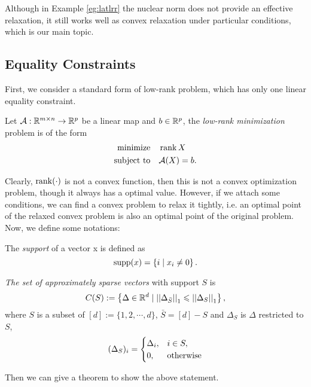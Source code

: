 \documentclass[11pt]{article}
\begin{document}
Although in Example \ref{eg:latlrr} the nuclear norm does not provide an effective relaxation, it still works well as convex relaxation under particular conditions, which is our main topic.

\subsection{Equality Constraints}

First, we consider a standard form of low-rank problem, which has only one linear equality constraint.
\begin{problem}
    Let \(\mathcal{A}:\mathbb R^{m\times n}\to \mathbb R^p\) be a linear map and \(b\in \mathbb R^p\), the \emph{low-rank minimization} problem is of the form 
    \[\begin{aligned}
        \textnormal{minimize}\quad & \operatorname{rank} X\\
        \textnormal{subject to}\quad & \mathcal A(X)=b.
    \end{aligned}\]
\end{problem}

Clearly, \(\operatorname{rank}(\cdot)\) is not a convex function, then this is not a convex optimization problem, though it always has a optimal value. However, if we attach some conditions, we can find a convex problem to relax it tightly, i.e. an optimal point of the relaxed convex problem is also an optimal point of the original problem. Now, we define some notations:

\begin{definition}[Support]
    The \emph{support} of a vector x is defined as
    \[\operatorname{supp}(x) = \left\{i \mid x_i \neq 0\right\}.\]
\end{definition}

\begin{definition}
    \emph{The set of approximately sparse vectors} with support \(S\) is 
    \[C(S):=\left\{\Delta \in \mathbb R^d \mid \left|\left|\Delta_{\bar{S}}\right|\right|_1\leqslant \left|\left|\Delta_S\right|\right|_1\right\},\]
    where \(S\) is a subset of \([d]:=\{1,2,\cdots,d\}\), \(\bar{S}=[d]-S\) and \(\Delta_S\) is \(\Delta\) restricted to \(S\),
    \[(\Delta_S)_i = \begin{cases}
        \Delta_i, & i \in S,\\
        0, & \textnormal{otherwise}
    \end{cases}\]
\end{definition}

Then we can give a theorem to show the above statement.
\end{document}

